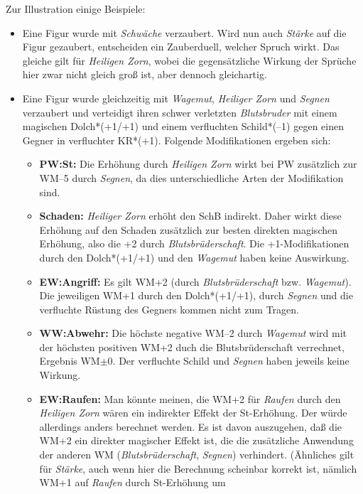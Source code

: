 \documentclass[10pt,a4paper,germanpar]{article}
\begin{document}
Zur Illustration einige Beispiele:

\begin{itemize}
\item Eine Figur wurde mit \emph{Schwäche} verzaubert. Wird nun auch
  \emph{Stärke} auf die Figur gezaubert, entscheiden ein Zauberduell,
  welcher Spruch wirkt. Das gleiche gilt für \emph{Heiligen Zorn},
  wobei die gegensätzliche Wirkung der Sprüche hier zwar nicht gleich
  groß ist, aber dennoch gleichartig.
\item Eine Figur wurde gleichzeitig mit \emph{Wagemut}, \emph{Heiliger
    Zorn} und \emph{Segnen} verzaubert und verteidigt
  ihren schwer verletzten \emph{Blutsbruder} mit einem magischen
  Dolch*(+1/+1) und einem verfluchten Schild*(--1) gegen einen Gegner
  in verfluchter KR*(+1). Folgende Modifikationen ergeben sich:
  \begin{itemize}
  \item \textbf{PW:St:} Die Erhöhung durch \emph{Heiligen Zorn} wirkt bei
    PW zusätzlich zur WM--5 durch \emph{Segnen}, da dies
    unterschiedliche Arten der Modifikation sind.
  \item \textbf{Schaden:} \emph{Heiliger Zorn} erhöht den SchB
    indirekt. Daher wirkt diese Erhöhung auf den Schaden zusätzlich
    zur besten direkten magischen Erhöhung, also die +2 durch
    \emph{Blutsbrüderschaft}. Die +1-Modifikationen durch den
    Dolch*(+1/+1) und den \emph{Wagemut} haben keine Auswirkung.
  \item \textbf{EW:Angriff:} Es gilt WM+2 (durch
    \emph{Blutsbrüderschaft} bzw. \emph{Wagemut}). Die jeweiligen WM+1
    durch den Dolch*(+1/+1), durch \emph{Segnen} und die verfluchte
    Rüstung des Gegners kommen nicht zum Tragen.
  \item \textbf{WW:Abwehr:} Die höchste negative WM--2 durch
    \emph{Wagemut} wird mit der höchsten positiven WM+2 duch die
    Blutsbrüderschaft verrechnet, Ergebnis WM$\pm$0. Der verfluchte
    Schild und \emph{Segnen} haben jeweils keine Wirkung.
  \item \textbf{EW:Raufen:} Man könnte meinen, die WM+2 für
    \emph{Raufen} durch den \emph{Heiligen Zorn} wären ein indirekter
    Effekt der St-Erhöhung. Der würde allerdings anders berechnet
    werden. Es ist davon auszugehen, daß die WM+2 ein direkter
    magischer Effekt ist, die die zusätzliche Anwendung der anderen WM
    (\emph{Blutsbrüderschaft}, \emph{Segnen}) verhindert. (Ähnliches
    gilt für \emph{Stärke}, auch wenn hier die Berechnung scheinbar
    korrekt ist, nämlich WM+1 auf \emph{Raufen} durch St-Erhöhung um

\end{itemize}
\end{itemize}
\end{document}

